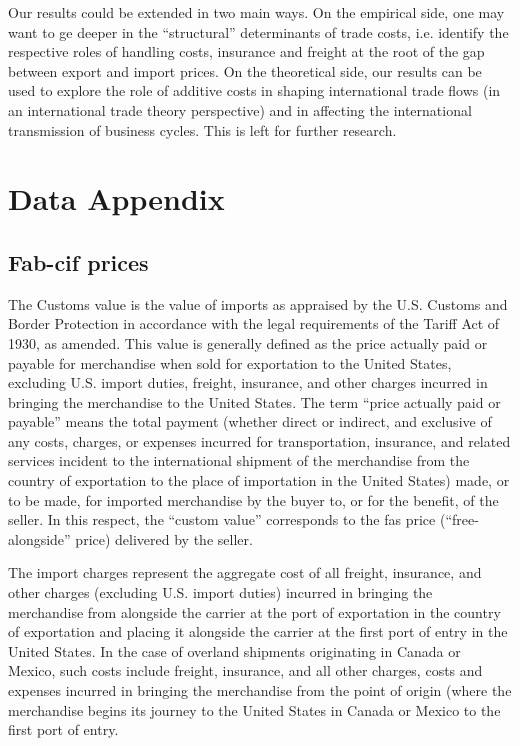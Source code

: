 \documentclass[a4paper,11pt]{article}
\begin{document}
Our results could be extended in two main ways. On the empirical side, one may want to ge deeper in the ``structural'' determinants of trade costs, i.e. identify the respective roles of handling costs, insurance and freight at the root of the gap between export and import prices. On the theoretical side, our results can be used to explore the role of additive costs in shaping international trade flows (in an international trade theory perspective) and in affecting the international transmission of business cycles. This is left for further research.



\newpage




\newpage


\appendix

\section{Data Appendix \label{app:data}}

\subsection{Fab-cif prices}

The Customs value is the value of imports as appraised by the U.S. Customs and Border Protection in accordance with the legal requirements of the Tariff Act of 1930, as amended. This value is generally defined as the price actually paid or payable for merchandise when sold for exportation to the United States, excluding U.S. import duties, freight, insurance, and other charges incurred in bringing the merchandise to the United States. The term ``price actually paid or payable'' means the total payment (whether direct or indirect, and exclusive of any costs, charges, or expenses incurred for transportation, insurance, and related services incident to the international shipment of the merchandise from the country of exportation to the place of importation in the United States) made, or to be made, for imported merchandise by the buyer to, or for the benefit, of the seller. In this respect, the ``custom value'' corresponds to the fas price (``free-alongside'' price) delivered by the seller.

The import charges represent the aggregate cost of all freight, insurance, and other charges (excluding U.S. import duties) incurred in bringing the merchandise from alongside the carrier at the port of exportation in the country of exportation and placing it alongside the carrier at the first port of entry in the United States. In the case of overland shipments originating in Canada or Mexico, such costs include freight, insurance, and all other charges, costs and expenses incurred in bringing the merchandise from the point of origin (where the merchandise begins its journey to the United States in Canada or Mexico to the first port of entry.
\end{document}
